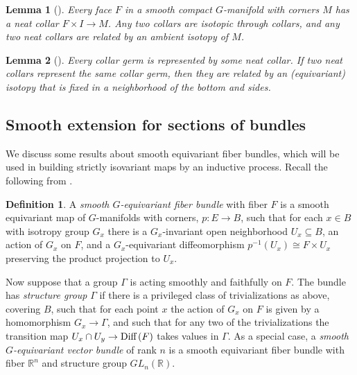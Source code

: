 \documentclass[11pt]{amsart}
\newtheorem{lem}{Lemma}[section]
\theoremstyle{definition}
\newtheorem{defn}{Definition}[section]
\numberwithin{equation}{section}
\numberwithin{figure}{section}
\newcommand{\R}{\mathbb R}
\newcommand{\Diff}{\textup{Diff}\,}
\newcommand{\ourdefn}[1]{{\it #1}}
\begin{document}
\begin{lem}[{\cite[Lem 2.55]{GIMM1}}]\label{collars_unique}\label{collar_isotopy_extension}
	Every face $F$ in a smooth compact $G$-manifold with corners $M$ has a neat collar $F \times I \to M$. Any two collars are isotopic through collars, and any two neat collars are related by an ambient isotopy of $M$. 
\end{lem}

\begin{lem}[{\cite[Lem 2.56]{GIMM1}}]\label{partial_collar}
Every collar germ is represented by some neat collar. If two neat collars represent the same collar germ, then they are related by an (equivariant) isotopy that is fixed in a neighborhood of the bottom and sides. 
\end{lem}


\subsection{Smooth extension for sections of bundles}\label{fiberbundles}

We discuss some results about smooth equivariant fiber bundles, which will be used in building strictly isovariant maps by an inductive process. %
Recall the following from \cite[Def 2.22]{GIMM1}.

\begin{defn}\label{fiber_bundle}
A \ourdefn{smooth $G$-equivariant fiber bundle} with fiber $F$ is a smooth equivariant map of $G$-manifolds with corners, $p\colon E \to B$, such that for each $x \in B$ with isotropy group $G_x$ there is a $G_x$-invariant open neighborhood $U_x \subseteq B$, an action of $G_x$ on $F$, and a $G_x$-equivariant diffeomorphism $p^{-1}(U_x)\cong F\times U_x$ preserving the product projection to $U_x$.
	
	Now suppose that a group $\Gamma$ is acting smoothly and faithfully on $F$. The bundle has \ourdefn{structure group} $\Gamma$ if there is a privileged class of trivializations as above, covering $B$, such that for each point $x$ the action of $G_x$ on $F$ is given by a homomorphism $G_x \to \Gamma$, and such that for any two of the trivializations the transition map $U_x\cap U_y\to \Diff(F)$ takes values in $\Gamma$. As a special case, a \ourdefn{smooth $G$-equivariant vector bundle} of rank $n$ is a smooth equivariant fiber bundle with fiber $\mathbb R^n$ and structure group $GL_n(\R)$.
\end{defn}
\end{document}
